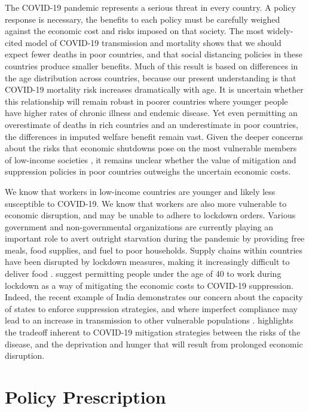 \documentclass[11pt]{article}
\begin{document}
\begin{mdframed}
The COVID-19 pandemic represents a serious threat in every country. A policy response is necessary, the benefits to each policy must be carefully weighed against the economic cost and risks imposed on that society. The most widely-cited model of COVID-19 transmission and mortality shows that we should expect fewer deaths in poor countries, and that social distancing policies in these countries produce smaller benefits. Much of this result is based on differences in the age distribution across countries, because our present understanding is that COVID-19 mortality risk increases dramatically with age. It is uncertain whether this relationship will remain robust in poorer countries where younger people have higher rates of chronic illness and endemic disease. Yet even permitting an overestimate of deaths in rich countries and an underestimate in poor countries, the differences in imputed welfare benefit remain vast. Given the deeper concerns about the risks that economic shutdowns pose on the most vulnerable members of low-income societies \parencite{saleh2020}, it remains unclear whether the value of mitigation and suppression policies in poor countries outweighs the uncertain economic costs.

We know that workers in low-income countries are younger and likely less susceptible to COVID-19. We know that workers are also more vulnerable to economic disruption, and may be unable to adhere to lockdown orders. Various government and non-governmental organizations are currently playing an important role to avert outright starvation during the pandemic by providing free meals, food supplies, and fuel to poor households. Supply chains within countries have been disrupted by lockdown measures, making it increasingly difficult to deliver food \parencite{purohit2020}. \textcite{ray2020} suggest permitting people under the age of 40 to work during lockdown as a way of mitigating the economic costs to COVID-19 suppression. Indeed, the recent example of India demonstrates our concern about the capacity of states to enforce suppression strategies, and where imperfect compliance may lead to an increase in transmission to other vulnerable populations \parencite{scroll2020}. \textcite{ravallion2020} highlights the tradeoff inherent to COVID-19 mitigation strategies between the risks of the disease, and the deprivation and hunger that will result from prolonged economic disruption. 

\section{Policy Prescription}


\end{mdframed}
\end{document}
